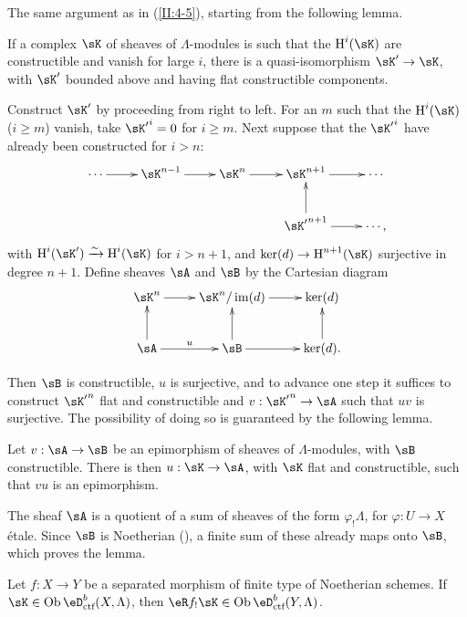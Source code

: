 The same argument as in (\ref{II:4-5}), starting from the following lemma.






\begin{lemma_}\label{II:4-7}
If a complex $\sK$ of sheaves of $\Lambda$-modules is such that the
$\h^i(\sK)$ are constructible and vanish for large $i$, there is a
quasi-isomorphism $\sK'\to \sK$, with $\sK'$ bounded above and having flat
constructible components.
\end{lemma_}

Construct $\sK'$ by proceeding from right to left. For an $m$ such that the
$\h^i(\sK)$ ($i\geqslant m$) vanish, take ${\sK'}^i = 0$ for
$i\geqslant m$. Next suppose that the ${\sK'}^i$ have already been
constructed for $i>n$:
\[\xymatrix{
  \cdots \ar[r]
    & \sK^{n-1} \ar[r]
    & \sK^n \ar[r]
    & \sK^{n+1} \ar[r]
    & \cdots \\
  & & & {\sK'}^{n+1} \ar[u] \ar[r]
    & \cdots \text{,}
}\]
with $\h^i(\sK')\iso \h^i(\sK)$ for $i>n+1$, and
$\ker(d)\to\h^{n+1}(\sK)$ surjective in degree $n+1$. Define sheaves $\sA$
and $\sB$ by the Cartesian diagram
\[\xymatrix{
  \sK^n \ar[r]
    & \sK^n/\im(d) \ar[r]
    & \ker(d) \\
  \sA \ar[u] \ar[r]^u
    & \sB \ar[u]\ar[r]
    & \ker(d) \ar[u] \text{.}
}\]

Then $\sB$ is constructible, $u$ is surjective, and to advance one step it
suffices to construct ${\sK'}^n$ flat and constructible and
$v:{\sK'}^n\to \sA$ such that $u v$ is surjective. The possibility of doing so
is guaranteed by the following lemma.






\begin{lemma_}\label{II:4-8}
Let $v:\sA\to \sB$ be an epimorphism of sheaves of $\Lambda$-modules, with
$\sB$ constructible. There is then $u:\sK\to \sA$, with $\sK$ flat and
constructible, such that $v u$ is an epimorphism.
\end{lemma_}

The sheaf $\sA$ is a quotient of a sum of sheaves of the form
$\varphi_! \Lambda$, for $\varphi:U\to X$ étale. Since $\sB$ is Noetherian
(\cite[IX.2.10]{sga4}), a finite sum of these already maps onto $\sB$, which
proves the lemma.






\begin{theorem_}\label{II:4-9}
Let $f:X\to Y$ be a separated morphism of finite type of Noetherian schemes.
If $\sK\in\ob\eD_\textnormal{ctf}^b(X,\Lambda)$, then
$\eR f_!\sK\in \ob\eD_\textnormal{ctf}^b(Y,\Lambda)$.
\end{theorem_}

